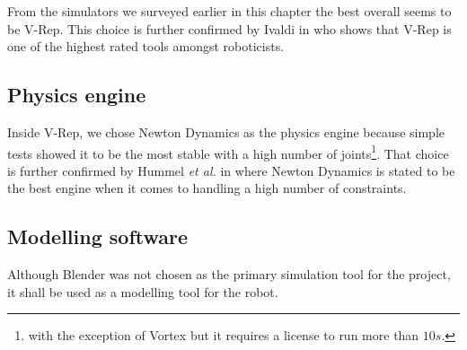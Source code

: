 From the simulators we surveyed earlier in this chapter the best overall seems to be V-Rep. This choice is further confirmed by Ivaldi in \cite{ivaldi2014tools} who shows that V-Rep is one of the highest rated tools amongst roboticists.

\subsection{Physics engine}
Inside V-Rep, we chose Newton Dynamics as the physics engine because simple tests showed it to be the most stable with a high number of joints\footnote{with the exception of Vortex but it requires a license to run more than $10s$.}. That choice is further confirmed by Hummel \textit{et al.} in \cite{hummel2012evaluation} where Newton Dynamics is stated to be the best engine when it comes to handling a high number of constraints.

\subsection{Modelling software}
Although Blender was not chosen as the primary simulation tool for the project, it shall be used as a modelling tool for the robot. 
